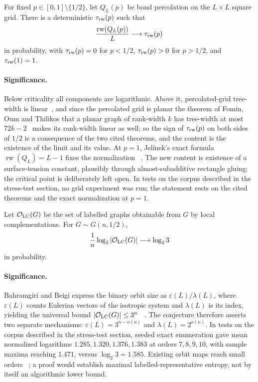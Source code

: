 \begin{conjecture}\label{as13}
For fixed $p\in[0,1]\setminus\{1/2\}$, let $Q_L(p)$ be bond percolation on
the $L\times L$ square grid.  There is a deterministic $\tau_{\rm rw}(p)$
such that
\[
 \frac{\operatorname{rw}(Q_L(p))}{L}\longrightarrow\tau_{\rm rw}(p)
\]
in probability, with $\tau_{\rm rw}(p)=0$ for $p<1/2$,
$\tau_{\rm rw}(p)>0$ for $p>1/2$, and $\tau_{\rm rw}(1)=1$.
\end{conjecture}

\paragraph{Significance.}
Below criticality all components are logarithmic.  Above it, percolated-grid tree-width is linear~\cite{LiMuller17}, and since the percolated grid is planar the theorem of Fomin, Oum and Thilikos that a planar graph of rank-width $k$ has tree-width at most $72k-2$~\cite{FominOumThilikos10} makes its rank-width linear as well; so the sign of $\tau_{\rm rw}(p)$ on both sides of $1/2$ is a consequence of the two cited theorems, and the content is the existence of the limit and its value.  At $p=1$, Jel\'inek's exact
formula $\operatorname{rw}(Q_L)=L-1$ fixes the normalization
~\cite{Jelinek10}.  The new content is existence of a surface-tension
constant, plausibly through almost-subadditive rectangle gluing; the critical
point is deliberately left open.  In tests on the corpus described in the stress-test section, no grid
experiment was run; the statement rests on the cited theorems and the exact
normalization at $p=1$.

\begin{conjecture}\label{as14}
Let $\mathcal O_{\rm LC}(G)$ be the set of labelled graphs obtainable from
$G$ by local complementations.  For $G\sim G(n,1/2)$,
\[
 \frac1n\log_2|\mathcal O_{\rm LC}(G)|\longrightarrow\log_2 3
\]
in probability.
\end{conjecture}

\paragraph{Significance.}
Bahramgiri and Beigi express the binary orbit size as
$\varepsilon(L)/\lambda(L)$, where $\varepsilon(L)$ counts Eulerian vectors
of the isotropic system and $\lambda(L)$ is its index, yielding the universal
bound $|\mathcal O_{\rm LC}(G)|\le3^n$
~\cite{BahramgiriBeigiEnumerating07}.  The conjecture therefore asserts two
separate mechanisms: $\varepsilon(L)=3^{n-o(n)}$ and
$\lambda(L)=2^{o(n)}$.  In tests on the corpus described in the stress-test section, seeded exact
enumeration gave mean normalized logarithms $1.285,1.320,1.376,1.383$ at
orders $7,8,9,10$, with sample maxima reaching $1.471$, versus
$\log_2 3=1.585$.  Existing orbit maps reach small orders
~\cite{AdcockEtAl20}; a proof would establish maximal
labelled-representative entropy, not by itself an algorithmic lower bound.

